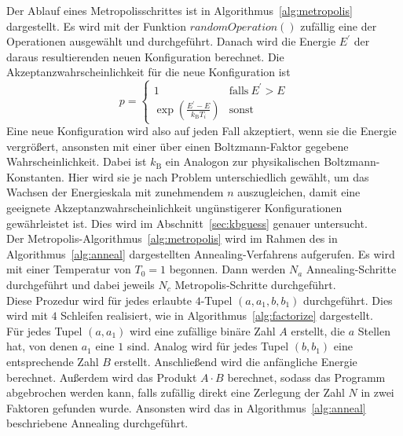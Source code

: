 Der Ablauf eines Metropolisschrittes ist in Algorithmus~\ref{alg:metropolis} dargestellt. Es wird mit der Funktion $\mathrm{\textit{randomOperation}}\left(\right)$ zufällig eine der Operationen ausgewählt und durchgeführt. Danach wird die Energie $E^\prime$ der daraus resultierenden neuen Konfiguration berechnet. Die Akzeptanzwahrscheinlichkeit für die neue Konfiguration ist
\begin{equation}
		p=\begin{cases}
				1 & \mathrm{falls}\: E^\prime > E \\
				\exp\left(\frac{E^\prime-E}{k_\mathrm{B} T_i}\right) & \mathrm{sonst}
		\end{cases}\label{eq:accept}
\end{equation}
Eine neue Konfiguration wird also auf jeden Fall akzeptiert, wenn sie die Energie vergrößert, ansonsten mit einer über einen Boltzmann-Faktor gegebene Wahrscheinlichkeit. Dabei ist $k_\mathrm{B}$ ein Analogon zur physikalischen Boltzmann-Konstanten. Hier wird sie je nach Problem unterschiedlich gewählt, um das Wachsen der Energieskala mit zunehmendem $n$ auszugleichen, damit eine geeignete Akzeptanzwahrscheinlichkeit ungünstigerer Konfigurationen gewährleistet ist. Dies wird im Abschnitt~\ref{sec:kbguess} genauer untersucht. \\
Der Metropolis-Algorithmus~\ref{alg:metropolis} wird im Rahmen des in Algorithmus~\ref{alg:anneal} dargestellten Annealing-Verfahrens aufgerufen. Es wird mit einer Temperatur von $T_0=1$ begonnen. Dann werden $N_a$ Annealing-Schritte durchgeführt und dabei jeweils $N_c$ Metropolis-Schritte durchgeführt. \\
Diese Prozedur wird für jedes erlaubte $4$-Tupel $\left(a,a_1,b,b_1\right)$ durchgeführt. Dies wird mit $4$ Schleifen realisiert, wie in Algorithmus~\ref{alg:factorize} dargestellt. \\
Für jedes Tupel $\left(a,a_1\right)$ wird eine zufällige binäre Zahl $A$ erstellt, die $a$ Stellen hat, von denen $a_1$ eine $1$ sind. Analog wird für jedes Tupel $\left(b,b_1\right)$ eine entsprechende Zahl $B$ erstellt. Anschließend wird die anfängliche Energie berechnet. Außerdem wird das Produkt $A\cdot B$ berechnet, sodass das Programm abgebrochen werden kann, falls zufällig direkt eine Zerlegung der Zahl $N$ in zwei Faktoren gefunden wurde. Ansonsten wird das in Algorithmus~\ref{alg:anneal} beschriebene Annealing durchgeführt.



\FloatBarrier{}

